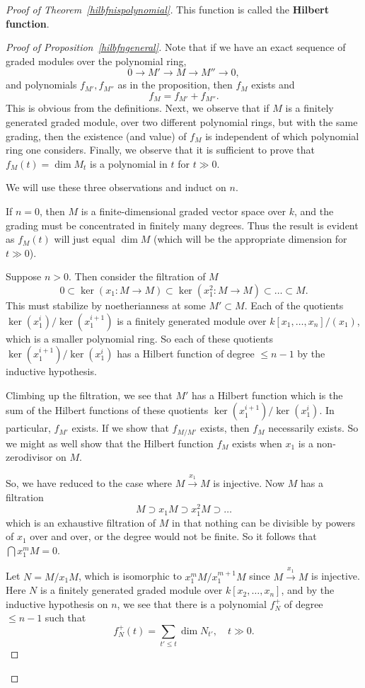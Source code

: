\begin{proof}[Proof of  Theorem~\ref{hilbfnispolynomial}]
This function is called the \textbf{Hilbert function}.

\begin{proof}[Proof of Proposition~\ref{hilbfngeneral}]
Note that if we have an exact sequence of graded modules over the polynomial
ring,
\[ 0 \to M' \to M \to M'' \to 0,   \]
and polynomials $f_{M'}, f_{M''}$ as in the proposition, then $f_M$ exists and 
\[ f_M = f_{M'} + f_{M''}.  \] This is obvious from the definitions.
Next, we observe that if $M$ is a finitely generated graded module, over two
different polynomial rings, but with the same grading, then the existence (and
value) of $f_M$ is independent of which polynomial ring one considers.
Finally, we observe that it is sufficient to prove that $f_M(t) = \dim M_t$ is a
polynomial in $t$ for $t \gg 0$.

We will
use these three observations and induct on $n$.

If $n  = 0$, then $M$ is a finite-dimensional graded vector space over
$k$, and the grading must be concentrated in finitely many degrees. Thus
the result is evident as $f_{M}(t)$ will just equal $\dim M$ (which will be the
appropriate dimension for $t \gg 0$). 

Suppose $n > 0$.  Then
consider the filtration of $M$
\[ 0 \subset \ker( x_1: M \to M) \subset \ker (x_1^2: M \to M) \subset \dots
\subset M.  \]
This must stabilize by noetherianness at some $M' \subset M$. Each of the
quotients $\ker( x_1^i)/\ker (x_1^{i+1})$ is a finitely generated module over
$k[x_1, \dots,
x_n]/(x_1)$, which is a smaller polynomial ring.  So each of these quotients
$\ker (x_1^{i+1})/\ker (x_1^{i})$ has a Hilbert function of degree $\leq n-1$ by
the inductive hypothesis. 

Climbing up the filtration, we see that  $M'$ has a Hilbert function which is the sum of the Hilbert functions of
these quotients $\ker(x_1^{i+1})/\ker(x_1^{i})$. In particular, $f_{M'}$ exists. If we show that $f_{M/M'}$
exists, then $f_M$ necessarily exists. So we might as well show that the
Hilbert function $f_M$ exists when $x_1$ is  a non-zerodivisor on $M$. 

So, we have reduced to the case where $M \stackrel{x_1}{\to} M$
is injective.
Now $M$ has a filtration
\[ M \supset x_1 M \supset x_1^2 M \supset \dots  \]
which is an exhaustive filtration of $M$ in that nothing can be divisible by
powers of $x_1$ over and over, or the degree would not be finite. So it
follows that  $\bigcap x_1^m M = 0$. 

Let $N = M/x_1 M $, which is isomorphic to $ x_1^m M/x_1^{m+1} M$ since $M \stackrel{x_1}{\to} M$ is
injective. Here $N$ is a finitely generated graded module over $k[x_2, \dots, x_n]$, and by the
inductive hypothesis on $n$, we see that there is a polynomial $f_N^+$ of degree $\leq n-1$ such that
\[ f_N^+(t) = \sum_{t' \leq t} \dim N_{t'}, \quad t \gg 0.  \]


\end{proof}
\end{proof}
